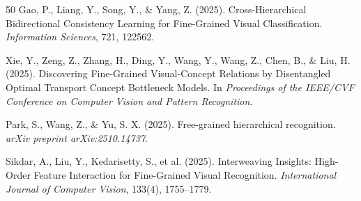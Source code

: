 \documentclass[pdflatex,iicol,sn-mathphys-num]{sn-jnl}
\theoremstyle{thmstyleone}%
\theoremstyle{thmstyletwo}%
\theoremstyle{thmstylethree}%
\begin{document}
{\begin{thebibliography}{50}
     Gao, P., Liang, Y., Song, Y., \& Yang, Z. (2025). Cross-Hierarchical Bidirectional Consistency Learning for Fine-Grained Visual Classification. \textit{Information Sciences}, 721, 122562.
    
     Xie, Y., Zeng, Z., Zhang, H., Ding, Y., Wang, Y., Wang, Z., Chen, B., \& Liu, H. (2025). Discovering Fine-Grained Visual-Concept Relations by Disentangled Optimal Transport Concept Bottleneck Models. In \textit{Proceedings of the IEEE/CVF Conference on Computer Vision and Pattern Recognition}.
    
     Park, S., Wang, Z., \& Yu, S. X. (2025). Free-grained hierarchical recognition. \textit{arXiv preprint arXiv:2510.14737}.
    
     Sikdar, A., Liu, Y., Kedarisetty, S., et al. (2025). Interweaving Insights: High-Order Feature Interaction for Fine-Grained Visual Recognition. \textit{International Journal of Computer Vision}, 133(4), 1755--1779.
    
\end{thebibliography}
}
\end{document}
